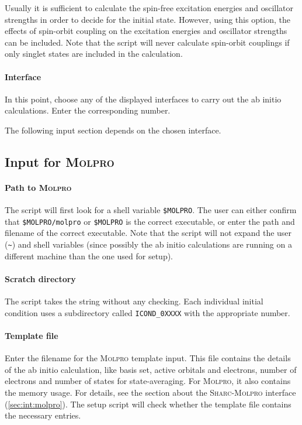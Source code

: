 \documentclass[a4paper,11pt,DIV=15,openany,twoside=false]{scrbook}
\newcommand{\sharc}{\textsc{Sharc}}
\newcommand{\ttt}[1]{\texttt{#1}}
\begin{document}
Usually it is sufficient to calculate the spin-free excitation energies and oscillator strengths in order to decide for the initial state. However, using this option, the effects of spin-orbit coupling on the excitation energies and oscillator strengths can be included. Note that the script will never calculate spin-orbit couplings if only singlet states are included in the calculation.

\paragraph{Interface}

In this point, choose any of the displayed interfaces to carry out the ab initio calculations. Enter the corresponding number. 

The following input section depends on the chosen interface.

\subsection{Input for \textsc{Molpro}}

\paragraph{Path to \textsc{Molpro}}

The script will first look for a shell variable \ttt{\$MOLPRO}. The user can either confirm that \ttt{\$MOLPRO/molpro} or \ttt{\$MOLPRO} is the correct executable, or enter the path and filename of the correct executable. Note that the script will not expand the user (\ttt{\textasciitilde}) and shell variables (since possibly the ab initio calculations are running on a different machine than the one used for setup).

\paragraph{Scratch directory}

The script takes the string without any checking. Each individual initial condition uses a subdirectory called \ttt{ICOND\_0XXXX} with the appropriate number. 

\paragraph{Template file}

Enter the filename for the \textsc{Molpro} template input. This file contains the details of the ab initio calculation, like basis set, active orbitals and electrons, number of electrons and number of states for state-averaging. For \textsc{Molpro}, it also contains the memory usage. For details, see the section about the \sharc-\textsc{Molpro} interface (\ref{sec:int:molpro}). The setup script will check whether the template file contains the necessary entries. 
\end{document}
